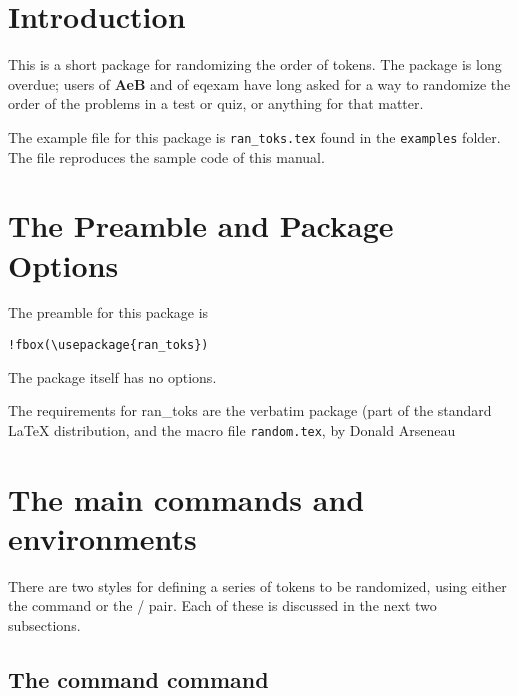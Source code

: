 \documentclass{article}
\def\exSrc{\makebox[0pt][r]{\large{\Pisymbol{webd}{157}}\enspace}}
\begin{document}
\maketitle

\tableofcontents
{}

\section{Introduction}

This is a short package for randomizing the order of tokens. The package
is long overdue; users of \textbf{AeB} and of \textsf{eqexam} have long asked for a way to
randomize the order of the problems in a test or quiz, or anything for
that matter.

\exSrc The example file for this package is \texttt{ran\_toks.tex} found in the
\texttt{examples} folder. The file reproduces the sample code of this
manual.

\section{The Preamble and Package Options}

The preamble for this package is
\begin{Verbatim}[xleftmargin=20pt,commandchars=!()]
!fbox(\usepackage{ran_toks})
\end{Verbatim}
The package itself has no options.

The requirements for \textsf{ran\_toks} are the \textsf{verbatim} package
(part of the standard {\LaTeX} distribution, and the macro file
\texttt{random.tex}, by Donald Arseneau


\section{The main commands and environments}\label{rtmain}

There are two styles for defining a series of tokens to be randomized,
using either the  command or the /
pair. Each of these is discussed in the next two subsections.

\subsection{The \texorpdfstring{\protect{}
command}{} command}
\end{document}
